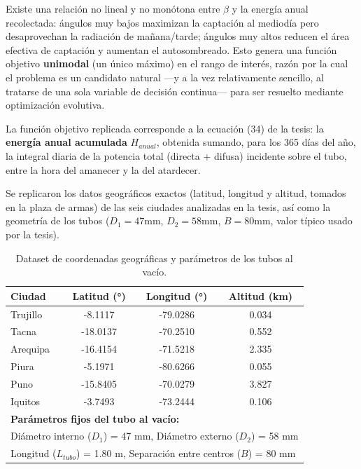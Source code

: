 \documentclass[11pt,a4paper]{article}
\begin{document}
Existe una relación no lineal y no monótona entre $\beta$ y la energía anual
recolectada: ángulos muy bajos maximizan la captación al mediodía pero
desaprovechan la radiación de mañana/tarde; ángulos muy altos reducen el
área efectiva de captación y aumentan el autosombreado. Esto genera una
función objetivo \textbf{unimodal} (un único máximo) en el rango de interés,
razón por la cual el problema es un candidato natural —y a la vez
relativamente sencillo, al tratarse de una sola variable de decisión
continua— para ser resuelto mediante optimización evolutiva.

La función objetivo replicada corresponde a la ecuación (34) de la tesis:
la \textbf{energía anual acumulada} $H_{anual}$, obtenida sumando, para los
365 días del año, la integral diaria de la potencia total (directa + difusa)
incidente sobre el tubo, entre la hora del amanecer y la del atardecer.

Se replicaron los datos geográficos exactos (latitud, longitud y altitud,
tomados en la plaza de armas) de las seis ciudades analizadas en la tesis,
así como la geometría de los tubos ($D_1=47$mm, $D_2=58$mm, $B=80$mm, valor
típico usado por la tesis).

\begin{table}[H]
\centering
\small
\caption{Dataset de coordenadas geográficas y parámetros de los tubos al vacío.}
\begin{tabular}{lccc}
\toprule
\textbf{Ciudad} & \textbf{Latitud (°)} & \textbf{Longitud (°)} & \textbf{Altitud (km)} \\
\midrule
Trujillo & -8.1117 & -79.0286 & 0.034 \\
Tacna & -18.0137 & -70.2510 & 0.552 \\
Arequipa & -16.4154 & -71.5218 & 2.335 \\
Piura & -5.1971 & -80.6266 & 0.055 \\
Puno & -15.8405 & -70.0279 & 3.827 \\
Iquitos & -3.7493 & -73.2444 & 0.106 \\
\bottomrule
\multicolumn{4}{l}{\textbf{Parámetros fijos del tubo al vacío:}} \\
\multicolumn{4}{l}{Diámetro interno ($D_1$) = 47 mm, Diámetro externo ($D_2$) = 58 mm} \\
\multicolumn{4}{l}{Longitud ($L_{tubo}$) = 1.80 m, Separación entre centros ($B$) = 80 mm} \\
\end{tabular}
\end{table}
\end{document}
